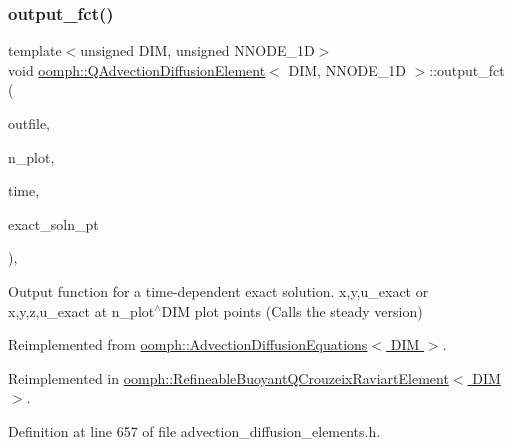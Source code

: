 \mbox{\label{classoomph_1_1QAdvectionDiffusionElement_a0e5d05a939eebc797ec8d6b400296bfd}} 
\subsubsection{\texorpdfstring{output\+\_\+fct()}{output\_fct()}\hspace{0.1cm}{\footnotesize\ttfamily [2/2]}}
{\footnotesize\ttfamily template$<$unsigned D\+IM, unsigned N\+N\+O\+D\+E\+\_\+1D$>$ \\
void \hyperlink{classoomph_1_1QAdvectionDiffusionElement}{oomph\+::\+Q\+Advection\+Diffusion\+Element}$<$ D\+IM, N\+N\+O\+D\+E\+\_\+1D $>$\+::output\+\_\+fct (\begin{DoxyParamCaption}\item[{std\+::ostream \&}]{outfile,  }\item[{const unsigned \&}]{n\+\_\+plot,  }\item[{const double \&}]{time,  }\item[{\hyperlink{classoomph_1_1FiniteElement_ad4ecf2b61b158a4b4d351a60d23c633e}{Finite\+Element\+::\+Unsteady\+Exact\+Solution\+Fct\+Pt}}]{exact\+\_\+soln\+\_\+pt }\end{DoxyParamCaption})\hspace{0.3cm}{\ttfamily [inline]}, {\ttfamily [virtual]}}



Output function for a time-\/dependent exact solution. x,y,u\+\_\+exact or x,y,z,u\+\_\+exact at n\+\_\+plot$^\wedge$\+D\+IM plot points (Calls the steady version) 



Reimplemented from \hyperlink{classoomph_1_1AdvectionDiffusionEquations_affb6feff30ffb8617315e555e1bb7185}{oomph\+::\+Advection\+Diffusion\+Equations$<$ D\+I\+M $>$}.



Reimplemented in \hyperlink{classoomph_1_1RefineableBuoyantQCrouzeixRaviartElement_aa1eaab23a14039a18701b5666629b5bc}{oomph\+::\+Refineable\+Buoyant\+Q\+Crouzeix\+Raviart\+Element$<$ D\+I\+M $>$}.



Definition at line 657 of file advection\+\_\+diffusion\+\_\+elements.\+h.

